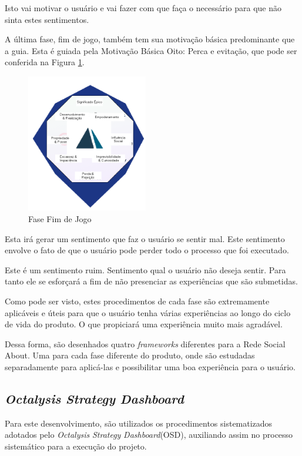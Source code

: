Isto vai motivar o usuário e vai fazer com que faça o necessário para que não
sinta estes sentimentos.

A última fase, fim de jogo, também tem sua motivação básica predominante que
a guia. Esta é guiada pela Motivação Básica Oito: Perca e evitação, que pode
ser conferida na Figura \ref{fig:fasefimdejogo}.

\begin{figure}[h]
    \centering
    \includegraphics[width=200px, scale=1]{figuras/fasefimdejogo}
    \caption{Fase Fim de Jogo}
    \label{fig:fasefimdejogo}
\end{figure}

Esta irá gerar um sentimento que faz o usuário se sentir mal. Este sentimento
envolve o fato de que o usuário pode perder todo o processo que foi executado.


Este é um sentimento ruim. Sentimento qual o usuário não deseja sentir. Para tanto
ele se esforçará a fim de não presenciar as experiências que são submetidas.

Como pode ser visto, estes procedimentos de cada fase são extremamente aplicáveis
e úteis para que o usuário tenha várias experiências ao longo do ciclo de vida do
produto. O que propiciará uma experiência muito mais agradável.

Dessa forma, são desenhados quatro \textit{frameworks} diferentes para a Rede Social About.
Uma para cada fase diferente do produto, onde são estudadas separadamente para
aplicá-las e possibilitar uma boa experiência para o usuário.

\subsection{\textit{Octalysis} \textit{Strategy} \textit{Dashboard}}
\label{sec:octalysisdashborad}
Para este desenvolvimento, são utilizados os procedimentos sistematizados adotados
pelo \textit{Octalysis} \textit{Strategy} \textit{Dashboard}(OSD), auxiliando assim no processo sistemático para
a execução do projeto. 

